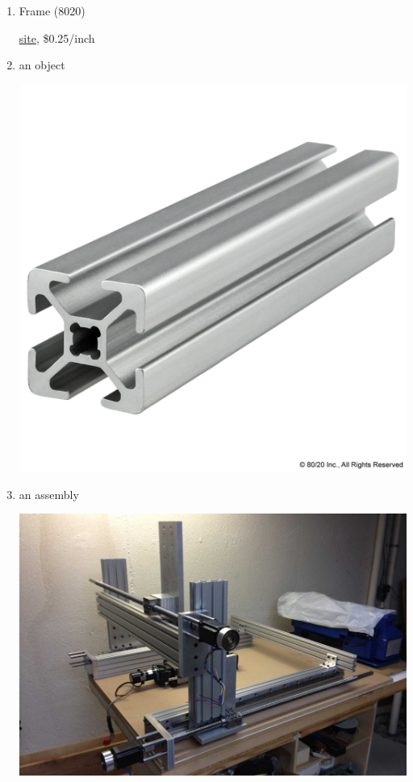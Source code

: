 \documentclass[11pt]{article}
\begin{document}
\begin{enumerate}
\item Frame (8020)
\label{sec:org25ffe36}

\href{https://8020.net/20-2020.html}{site}, \$0.25/inch


\item an object
\label{sec:org6717900}
\begin{center}
\includegraphics[width=.9\linewidth]{Hardware_needed/2022-07-18_13-11-55_screenshot.png}
\end{center}
\item an assembly
\label{sec:orgd042e0c}
\begin{center}
\includegraphics[width=.9\linewidth]{Hardware_needed/2022-07-18_13-13-15_screenshot.png}
\end{center}


\end{enumerate}
\end{document}
